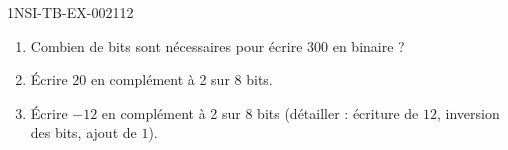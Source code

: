 \begin{exercice}{1NSI-TB-EX-002}{1}{12}
\begin{enumerate}
  \item Combien de bits sont nécessaires pour écrire $300$ en binaire ?
  \item Écrire $20$ en complément à 2 sur $8$ bits.
  \item Écrire $-12$ en complément à 2 sur $8$ bits (détailler : écriture de $12$, inversion des bits, ajout de $1$).
\end{enumerate}
\end{exercice}
